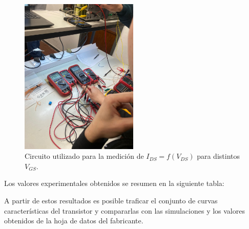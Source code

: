     \begin{figure}[H]
    \centering
    \includegraphics[width=0.5\textwidth]{pictures/robada-tp3.jpeg}
    \caption{Circuito utilizado para la medición de $I_{DS} = f(V_{DS})$ para distintos $V_{GS}$.}
    \label{fig:jfet-carac}
    \end{figure}
    
    Los valores experimentales obtenidos se resumen en la siguiente tabla:
    
    \begin{table}[H]
    \centering
    \caption{Valores de $I_{DS}$ en función de $V_{DS}$ para distintos valores de $V_{GS}$.}
    \label{tab:ids-vds-vgs}
    \end{table}
    
    A partir de estos resultados es posible traficar el conjunto de curvas características del transistor y compararlas
    con las simulaciones y los valores obtenidos de la hoja de datos del fabricante.
    

